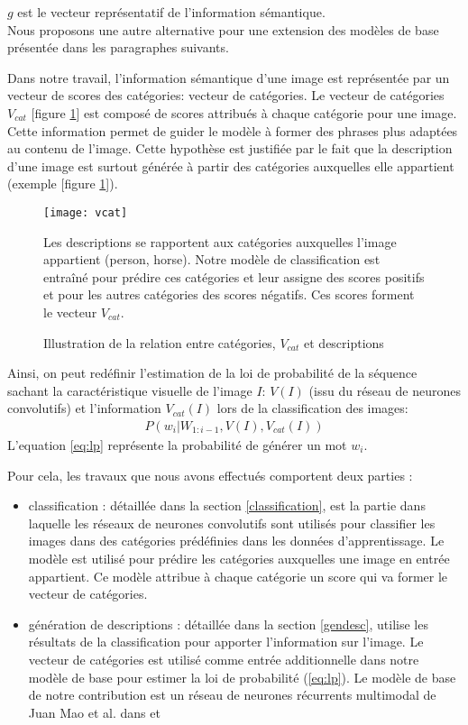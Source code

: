 $g$ est le vecteur représentatif de l'information sémantique.\\

Nous proposons une autre alternative pour une extension des modèles de base présentée dans les paragraphes suivants.

Dans notre travail, l'information sémantique d'une image est représentée par un vecteur de scores des catégories: vecteur de catégories. Le vecteur de catégories $V_{cat}$ [figure \ref{fig:vcat}] est composé de scores attribués à chaque catégorie pour une image. Cette information permet de guider le modèle à former des phrases plus adaptées au contenu de l'image. Cette hypothèse est justifiée par le fait que la description d'une image est surtout générée à partir des catégories auxquelles elle appartient (exemple [figure \ref{fig:vcat}]).\\

\medskip
\begin{figure}[h]
	\begin{center}
	\label{fig:vcat}
		\texttt{[image: vcat]}
		\caption{Illustration de la relation entre catégories, $V_{cat}$ et descriptions}
	\end{center}
	Les descriptions se rapportent aux catégories auxquelles l'image appartient (person, horse). Notre modèle de classification est entraîné pour prédire ces catégories et leur assigne des scores positifs et pour les autres catégories des scores négatifs. Ces scores forment le vecteur $V_{cat}$. 
\end{figure}

Ainsi, on peut redéfinir l'estimation de la loi de probabilité de la séquence sachant la caractéristique visuelle de l'image $I$: $V(I)$ (issu du réseau de neurones convolutifs) et l'information  $V_{cat}(I)$ lors de la classification des images:
\begin{eqnarray}
\label{eq:lp}
P(w_{i}| W_{1:i-1}, V(I), V_{cat}(I))
\end{eqnarray}
L'equation \ref{eq:lp} représente la probabilité de générer un mot $w_{i}$.

Pour cela, les travaux que nous avons effectués comportent deux parties :
\begin{itemize}
	\item classification : détaillée dans la section \ref{classification}, est la partie dans laquelle les réseaux de neurones convolutifs sont utilisés pour classifier les images dans des catégories prédéfinies dans les données d'apprentissage. Le modèle est utilisé pour prédire les catégories auxquelles une image en entrée appartient. Ce modèle attribue à chaque catégorie un score qui va former le vecteur de catégories.
	\item génération de descriptions : détaillée dans la section \ref{gendesc}, utilise les résultats de la classification pour apporter l'information sur l'image. Le vecteur de catégories est utilisé comme entrée additionnelle dans notre modèle de base pour estimer la loi de probabilité (\ref{eq:lp}). Le modèle de base de notre contribution est un réseau de neurones récurrents multimodal de Juan Mao et al. dans \cite{mao2014explain} \cite{mao2014deep} et \cite{mao2015learning}
\end{itemize}

